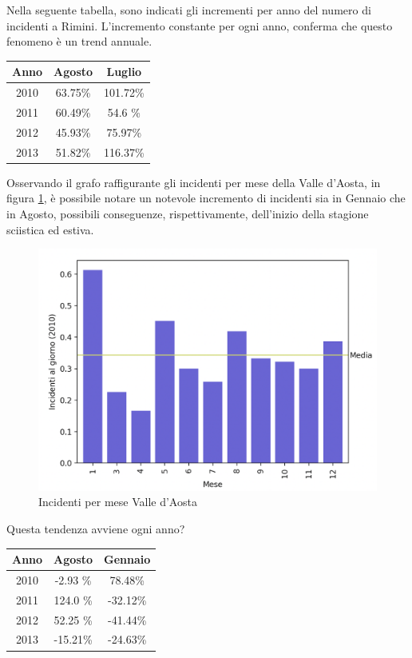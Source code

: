 \documentclass[a4paper]{report}
\begin{document}
Nella seguente tabella, sono indicati gli incrementi per anno del numero di incidenti a Rimini.
L'incremento constante per ogni anno, conferma che questo fenomeno è un trend annuale.

\begin{center}
    \def\arraystretch{1.5}%
    \begin{tabular}{ |c|c|c| } 
    \hline
    Anno & Agosto & Luglio \\ 
    \hline
    \rowcolor{TableGray}
    2010 & 63.75\% & 101.72\% \\ 
    2011 & 60.49\% & 54.6 \%  \\
    \rowcolor{TableGray}
    2012 & 45.93\% & 75.97\%  \\
    2013 & 51.82\% & 116.37\% \\
    \hline
    \end{tabular}
\end{center}


Osservando il grafo raffigurante gli incidenti per mese della Valle d'Aosta, 
in figura \ref{fig:aosta}, 
è possibile notare un notevole incremento di incidenti sia in Gennaio che in Agosto, possibili 
conseguenze, rispettivamente, dell'inizio della stagione sciistica ed estiva.

\begin{figure}
    \includegraphics[width=\linewidth]{../src/incidenti/incidenti_senza_coords/mese_incidenti/aosta_mese.png}
    \caption{Incidenti per mese Valle d'Aosta}
    \label{fig:aosta}
\end{figure}

Questa tendenza avviene ogni anno?

\begin{center}
    \def\arraystretch{1.5}%
    \begin{tabular}{ |c|c|c| } 
    \hline
    Anno & Agosto & Gennaio \\ 
    \hline
    \rowcolor{TableGray}
    2010 & -2.93 \% & 78.48\%  \\ 
    2011 & 124.0 \% & -32.12\% \\
    \rowcolor{TableGray}
    2012 & 52.25 \% & -41.44\% \\
    2013 & -15.21\% & -24.63\% \\
    \hline
    \end{tabular}
\end{center}
\end{document}
